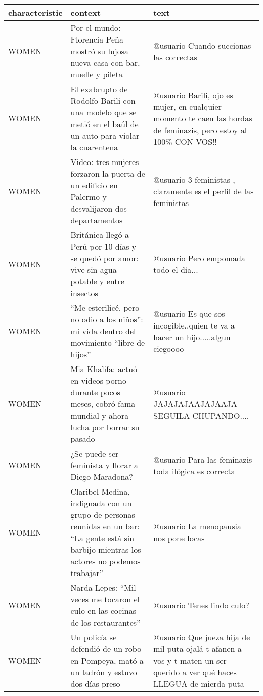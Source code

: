 \begin{table}
    \scriptsize
    \centering
    \begin{tabularx}{\textwidth}{l X X}
        \toprule
        characteristic & context & text \\
        \midrule
        WOMEN & Por el mundo: Florencia Peña mostró su lujosa nueva casa con bar, muelle y pileta & @usuario Cuando succionas las correctas \\
        WOMEN & El exabrupto de Rodolfo Barili con una modelo que se metió en el baúl de un auto para violar la cuarentena & @usuario Barili, ojo es mujer, en cualquier momento te caen las hordas de feminazis, pero estoy al 100\% CON VOS!! \\
        WOMEN & Video: tres mujeres forzaron la puerta de un edificio en Palermo y desvalijaron dos departamentos & @usuario 3 feministas , claramente es el perfil de las feministas \\
        WOMEN & Británica llegó a Perú por 10 días y se quedó por amor: vive sin agua potable y entre insectos & @usuario Pero empomada todo el día... \\
        WOMEN & “Me esterilicé, pero no odio a los niños”: mi vida dentro del movimiento “libre de hijos” & @usuario Es que sos incogible..quien te va a hacer un hijo.....algun ciegoooo \\
        WOMEN & Mia Khalifa: actuó en videos porno durante pocos meses, cobró fama mundial y ahora lucha por borrar su pasado & @usuario JAJAJAJAAJAJAAJA SEGUILA CHUPANDO.... \\
        WOMEN & ¿Se puede ser feminista y llorar a Diego Maradona? & @usuario Para las feminazis toda ilógica es correcta \\
        WOMEN & Claribel Medina, indignada con un grupo de personas reunidas en un bar: “La gente está sin barbijo mientras los actores no podemos trabajar” & @usuario La menopausia nos pone locas 🤦🏽‍♀️🤣 \\
        WOMEN & Narda Lepes: “Mil veces me tocaron el culo en las cocinas de los restaurantes” & @usuario Tenes lindo culo? \\
        WOMEN & Un policía se defendió de un robo en Pompeya, mató a un ladrón y estuvo dos días preso & @usuario Que jueza hija de mil puta ojalá t afanen a vos y t maten un ser querido a ver qué haces LLEGUA de mierda puta \\

\end{tabularx}
\end{table}

